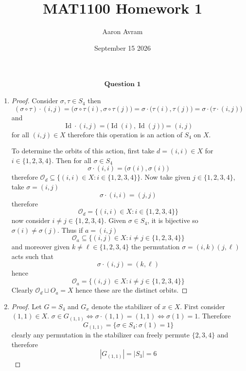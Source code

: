 \documentclass[12pt]{article}
\title{MAT1100 Homework 1}
\author{Aaron Avram}
\date{September 15 2026}
\begin{document}
\newtheorem{definition}{Definition}
\newtheorem{theorem}{Theorem}
\newtheorem{claim}{Claim}
\newtheorem{corollary}{Corollary}

\maketitle

\begin{align*}
    \textbf{Question 1}
\end{align*}

\begin{enumerate}
    \item[(a)]
    \begin{proof}
        Consider $\sigma, \tau \in S_4$ then
        \[ (\sigma \circ \tau) \cdot (i, j) = \Big(\sigma \circ \tau(i), \sigma \circ \tau(j)\Big) = \sigma \cdot \Big(\tau(i), \tau(j)\Big) = \sigma \cdot \Big(\tau \cdot (i, j) \Big) \]
        and
        \[ \operatorname{Id}\cdot (i, j) = \Big(\operatorname{Id}(i), \operatorname{Id}(j) \Big) = (i, j) \]
        for all $(i, j) \in X$ therefore this operation is an action of $S_4$ on $X$.

        To determine the orbits of this action, first take $d = (i, i) \in X$ for $i \in \{ 1, 2, 3, 4 \}$.
        Then for all $\sigma \in S_4$
        \[ \sigma \cdot (i, i) = \Big(\sigma(i), \sigma(i)\Big) \]
        therefore $\mathcal O_d \subseteq \{ (i, i) \in X : i \in \{ 1, 2, 3, 4 \} \}$.
        Now take given $j \in \{ 1, 2, 3, 4 \}$, take $\sigma = (i, j)$
        \[ \sigma \cdot (i, i) = (j, j) \]
        therefore
        \[ \mathcal O_d = \{ (i, i) \in X : i \in \{ 1, 2, 3, 4 \} \} \]
        now consider $i \neq j \in \{ 1, 2, 3, 4 \}$. Given $\sigma \in S_4$,
        it is bijective so $\sigma(i) \neq \sigma(j)$. Thus if $a = (i, j)$
        \[ \mathcal O_a \subseteq \{ (i, j) \in X : i \neq j \in \{ 1, 2, 3, 4 \} \} \]
        and moreover given $k \neq \ell \in \{ 1, 2, 3, 4 \}$ the permutation $\sigma = (i, k)(j, \ell)$
        acts such that
        \[ \sigma \cdot (i, j) = (k, \ell) \]
        hence
        \[ \mathcal O_a = \{ (i, j) \in X : i \neq j \in \{ 1, 2, 3, 4 \} \} \]
        Clearly $\mathcal O_d \sqcup O_a = X$ hence these are the distinct orbits.
    \end{proof}

    \item[(b)]
    \begin{proof}
        Let $G = S_4$ and $G_x$ denote the stabilizer of $x \in X$. First consider $(1, 1) \in X$. $\sigma \in G_{(1, 1)} \iff \sigma \cdot (1, 1) = (1, 1) \iff \sigma(1) = 1$.
        Therefore
        \[ G_{(1, 1)} = \{ \sigma \in S_4 : \sigma(1) = 1 \} \]
        clearly any permutation in the stabilizer can freely permute $\{ 2, 3, 4 \}$
        and therefore
        \[ |G_{(1, 1)}| = |S_3| = 6 \]


\end{proof}
\end{enumerate}
\end{document}
